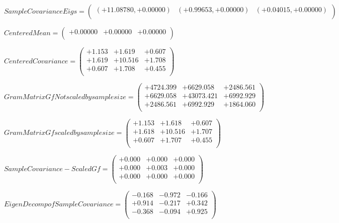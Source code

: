 \documentclass[9pt]{article}
\theoremstyle{plain}
\theoremstyle{definition}
\theoremstyle{remark}
\numberwithin{equation}{section}
\begin{document}
$Sample Covariance Eigs = \left(
\begin{array}{
ccc}
(+11.08780,+0.00000) & (+0.99653,+0.00000) & (+0.04015,+0.00000) \\
\end{array}
\right)$ \newline 

$Centered Mean = \left(
\begin{array}{
ccc}
+0.00000 & +0.00000 & +0.00000 \\
\end{array}
\right)$ \newline 

$Centered Covariance = \left(
\begin{array}{
ccc}
+1.153 & +1.619 & +0.607 \\
+1.619 & +10.516 & +1.708 \\
+0.607 & +1.708 & +0.455 \\
\end{array}
\right)$ \newline 

$Gram Matrix Gf Not scaled by sample size = \left(
\begin{array}{
ccc}
+4724.399 & +6629.058 & +2486.561 \\
+6629.058 & +43073.421 & +6992.929 \\
+2486.561 & +6992.929 & +1864.060 \\
\end{array}
\right)$ \newline 

$Gram Matrix Gf  scaled by sample size = \left(
\begin{array}{
ccc}
+1.153 & +1.618 & +0.607 \\
+1.618 & +10.516 & +1.707 \\
+0.607 & +1.707 & +0.455 \\
\end{array}
\right)$ \newline 

$SampleCovariance - Scaled Gf = \left(
\begin{array}{
ccc}
+0.000 & +0.000 & +0.000 \\
+0.000 & +0.003 & +0.000 \\
+0.000 & +0.000 & +0.000 \\
\end{array}
\right)$ \newline 

$EigenDecomp of SampleCovariance = \left(
\begin{array}{
ccc}
-0.168 & -0.972 & -0.166 \\
+0.914 & -0.217 & +0.342 \\
-0.368 & -0.094 & +0.925 \\
\end{array}
\right)$ \newline 
\end{document}
